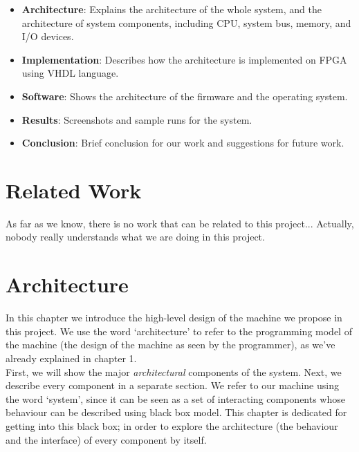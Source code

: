\documentclass[oneside]{book}
\begin{document}
\begin{itemize}

\item \textbf{Architecture}: Explains the architecture of the whole system,
and the architecture of system components, including CPU, system bus,
memory, and I/O devices.

\item \textbf{Implementation}: Describes how the architecture is implemented
on FPGA using VHDL language.

\item \textbf{Software}: Shows the architecture of the firmware and the
operating system.

\item \textbf{Results}: Screenshots and sample runs for the system.

\item \textbf{Conclusion}: Brief conclusion for our work and suggestions for
future work.

\end{itemize}


\chapter{Related Work}

As far as we know, there is no work that can be related to this project...
Actually, nobody really understands what we are doing in this project.


\chapter{Architecture}

In this chapter we introduce the high-level design of the machine
we propose in this project. We use the word `architecture' to refer
to the programming model of the machine (the design of the machine as
seen by the programmer), as we've already explained in chapter 1.\\

First, we will show the major \textit{architectural} components of the
system. Next, we describe every component
in a separate section. We refer to our machine using the word `system',
since it can be seen as a set of interacting components whose behaviour can be
described using black box model. This chapter is dedicated for getting
into this black box; in order to explore the architecture (the behaviour
and the interface) of every component by itself.
\end{document}
